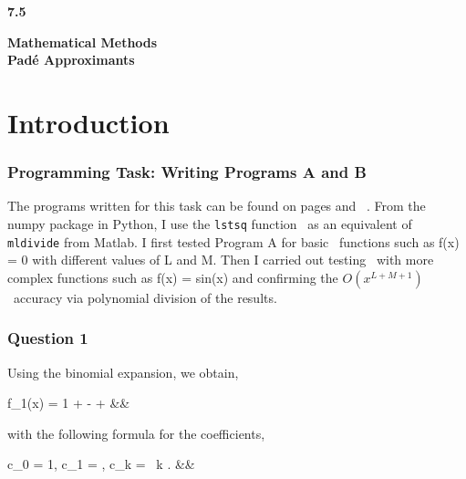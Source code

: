 \documentclass[12pt, a4paper]{article}
\begin{document}
	
	\setlength{\parindent}{0pt}
	\captionsetup{justification=centering}
	\lstset{
		showstringspaces=false
	}
	
	
	\begin{titlepage}
		\LARGE
		\textbf{7.5}
		\begin{center}
			\vspace*{7cm}
			
			\LARGE
			\textbf{Mathematical Methods}
			\\
			\vspace{1cm}
			\textbf{Pad\'e Approximants}
			
			\vspace{0.5cm}
		\end{center}
	\end{titlepage}

\section{Introduction}	
	
\subsubsection*{Programming Task: Writing Programs A and B}

The programs written for this task can be found on pages \pageref{Program_A} and \
\pageref{Program_B}. From the numpy package in Python, I use the \texttt{lstsq} function \
as an equivalent of \texttt{mldivide} from Matlab. I first tested Program A for basic \
functions such as f(x) = 0 with different values of L and M. Then I carried out testing \
with more complex functions such as f(x) = sin(x) and confirming the $O(x^{L+M+1})$ \
accuracy via polynomial division of the results.


\subsubsection*{Question 1}

Using the binomial expansion, we obtain,
\begin{flalign*}
	f_{1}(x) = 1 +  -  +  &&
\end{flalign*}
with the following formula for the coefficients,
\begin{flalign*}
	c_{0} = 1, \quad c_{1} = , \quad c_{k} =   \ 
	k . &&
\end{flalign*}
\end{document}
